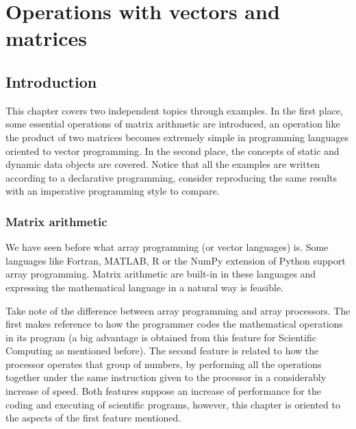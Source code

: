 \chapter{Operations with vectors and matrices}    \label{chap:matrices}


\vspace{-.7cm}
\section{Introduction}

This chapter covers two independent topics through examples. In the first place, some essential 
operations of matrix arithmetic are introduced, an operation like the product of two matrices becomes 
extremely simple in programming languages oriented to vector programming. 
In the second place, the concepts of static and dynamic 
data objects are covered. Notice that all the examples are written according to a 
declarative programming, consider reproducing the same results with an imperative programming style to 
compare.
    
    \vspace{-.3cm}
    \subsection*{Matrix arithmetic}
    \vspace{-.2cm}

We have seen before what array programming (or vector languages) is.
Some languages like Fortran, MATLAB, R or the NumPy extension of Python support array programming.
Matrix arithmetic are built-in in these languages and expressing the mathematical language in a natural way is feasible.

Take note of the difference between array programming and array processors. The first makes reference to how the programmer 
codes the mathematical operations in its program (a big advantage is obtained from this feature for Scientific Computing as mentioned before). 
The second feature is related to how the processor operates that group of numbers, by performing
all the operations together under the same instruction given to the processor in a considerably increase of speed.
Both features suppose an increase of performance for the coding and executing of scientific programs, however, this chapter is 
oriented to the aspects of the first feature mentioned. 


